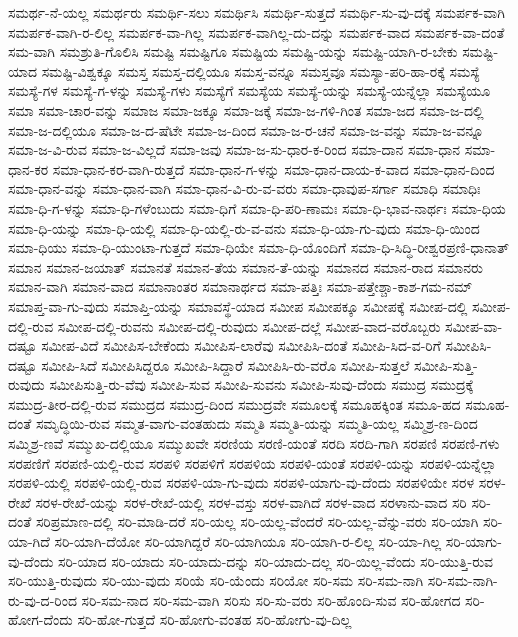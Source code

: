 {ಸಮರ್ಥ-ನೆ-ಯಲ್ಲ
ಸಮರ್ಥರು
ಸಮರ್ಥಿ-ಸಲು
ಸಮರ್ಥಿಸಿ
ಸಮರ್ಥಿ-ಸುತ್ತದೆ
ಸಮರ್ಥಿ-ಸು-ವು-ದಕ್ಕೆ
ಸಮರ್ಪಕ-ವಾಗಿ
ಸಮರ್ಪಕ-ವಾಗಿ-ರ-ಲಿಲ್ಲ
ಸಮರ್ಪಕ-ವಾ-ಗಿಲ್ಲ
ಸಮರ್ಪಕ-ವಾಗಿಲ್ಲ-ದು-ದನ್ನು
ಸಮರ್ಪಕ-ವಾದ
ಸಮರ್ಪಕ-ವಾ-ದಂತೆ
ಸಮ-ವಾಗಿ
ಸಮಶ್ರುತಿ-ಗೊಲಿಸಿ
ಸಮಷ್ಟಿ
ಸಮಷ್ಟಿಗೂ
ಸಮಷ್ಟಿಯ
ಸಮಷ್ಟಿ-ಯನ್ನು
ಸಮಷ್ಟಿ-ಯಾಗಿ-ರ-ಬೇಕು
ಸಮಷ್ಟಿ-ಯಾದ
ಸಮಷ್ಟಿ-ವಿಶ್ವಕ್ಕೂ
ಸಮಸ್ತ
ಸಮಸ್ತ-ದಲ್ಲಿಯೂ
ಸಮಸ್ತ-ವನ್ನೂ
ಸಮಸ್ತವೂ
ಸಮಸ್ಯಾ-ಪರಿ-ಹಾ-ರಕ್ಕೆ
ಸಮಸ್ಯೆ
ಸಮಸ್ಯೆ-ಗಳ
ಸಮಸ್ಯೆ-ಗ-ಳನ್ನು
ಸಮಸ್ಯೆ-ಗಳು
ಸಮಸ್ಯೆಗೆ
ಸಮಸ್ಯೆಯ
ಸಮಸ್ಯೆ-ಯನ್ನು
ಸಮಸ್ಯೆ-ಯನ್ನೆಲ್ಲಾ
ಸಮಸ್ಯೆಯೂ
ಸಮಾ
ಸಮಾ-ಚಾರ-ವನ್ನು
ಸಮಾಜ
ಸಮಾ-ಜಕ್ಕೂ
ಸಮಾ-ಜಕ್ಕೆ
ಸಮಾ-ಜ-ಗಳಿ-ಗಿಂತ
ಸಮಾ-ಜದ
ಸಮಾ-ಜ-ದಲ್ಲಿ
ಸಮಾ-ಜ-ದಲ್ಲಿಯೂ
ಸಮಾ-ಜ-ದ-ಷೆಟೇ
ಸಮಾ-ಜ-ದಿಂದ
ಸಮಾ-ಜ-ರ-ಚನೆ
ಸಮಾ-ಜ-ವನ್ನು
ಸಮಾ-ಜ-ವನ್ನೂ
ಸಮಾ-ಜ-ವಿ-ರುವ
ಸಮಾ-ಜ-ವಿಲ್ಲದೆ
ಸಮಾ-ಜವು
ಸಮಾ-ಜ-ಸು-ಧಾರ-ಕ-ರಿಂದ
ಸಮಾ-ದಾನ
ಸಮಾ-ಧಾನ
ಸಮಾ-ಧಾನ-ಕರ
ಸಮಾ-ಧಾನ-ಕರ-ವಾಗಿ-ರುತ್ತದೆ
ಸಮಾ-ಧಾನ-ಗ-ಳನ್ನು
ಸಮಾ-ಧಾನ-ದಾಯ-ಕ-ವಾದ
ಸಮಾ-ಧಾನ-ದಿಂದ
ಸಮಾ-ಧಾನ-ವನ್ನು
ಸಮಾ-ಧಾನ-ವಾಗಿ
ಸಮಾ-ಧಾನ-ವಿ-ರು-ವ-ವರು
ಸಮಾ-ಧಾವುಪ-ಸರ್ಗಾ
ಸಮಾಧಿ
ಸಮಾಧಿಃ
ಸಮಾ-ಧಿ-ಗ-ಳನ್ನು
ಸಮಾ-ಧಿ-ಗಳೆಂಬುದು
ಸಮಾ-ಧಿಗೆ
ಸಮಾ-ಧಿ-ಪರಿ-ಣಾಮಃ
ಸಮಾ-ಧಿ-ಭಾವ-ನಾರ್ಥಃ
ಸಮಾ-ಧಿಯ
ಸಮಾ-ಧಿ-ಯನ್ನು
ಸಮಾ-ಧಿ-ಯಲ್ಲಿ
ಸಮಾ-ಧಿ-ಯಲ್ಲಿ-ರು-ವ-ವನು
ಸಮಾ-ಧಿ-ಯಾ-ಗು-ವುದು
ಸಮಾ-ಧಿ-ಯಿಂದ
ಸಮಾ-ಧಿಯು
ಸಮಾ-ಧಿ-ಯುಂಟಾ-ಗುತ್ತದೆ
ಸಮಾ-ಧಿಯೇ
ಸಮಾ-ಧಿ-ಯೊಂದಿಗೆ
ಸಮಾ-ಧಿ-ಸಿದ್ಧಿ-ರೀಶ್ವರಪ್ರಣಿ-ಧಾನಾತ್
ಸಮಾನ
ಸಮಾನ-ಜಯಾತ್
ಸಮಾನತೆ
ಸಮಾನ-ತೆಯ
ಸಮಾನ-ತೆ-ಯನ್ನು
ಸಮಾನದ
ಸಮಾನ-ರಾದ
ಸಮಾನರು
ಸಮಾನ-ವಾಗಿ
ಸಮಾನ-ವಾದ
ಸಮಾನಾಂತರ
ಸಮಾನಾರ್ಥದ
ಸಮಾ-ಪತ್ತಿಃ
ಸಮಾ-ಪತ್ತೇಶ್ಚಾ-ಕಾಶ-ಗಮ-ನಮ್
ಸಮಾಪ್ತ-ವಾ-ಗು-ವುದು
ಸಮಾಪ್ತಿ-ಯನ್ನು
ಸಮಾವಸ್ಥೆ-ಯಾದ
ಸಮೀಪ
ಸಮೀಪಕ್ಕೂ
ಸಮೀಪಕ್ಕೆ
ಸಮೀಪ-ದಲ್ಲಿ
ಸಮೀಪ-ದಲ್ಲಿ-ರುವ
ಸಮೀಪ-ದಲ್ಲಿ-ರುವನು
ಸಮೀಪ-ದಲ್ಲಿ-ರುವುದು
ಸಮೀಪ-ದಲ್ಲೆ
ಸಮೀಪ-ವಾದ-ವರೊಬ್ಬರು
ಸಮೀಪ-ವಾ-ದಷ್ಟೂ
ಸಮೀಪ-ವಿದೆ
ಸಮೀಪಿಸ-ಬೇಕೆಂದು
ಸಮೀಪಿಸ-ಲಾರೆವು
ಸಮೀಪಿಸಿ-ದಂತೆ
ಸಮೀಪಿ-ಸಿದ-ವ-ರಿಗೆ
ಸಮೀಪಿಸಿ-ದಷ್ಟೂ
ಸಮೀಪಿ-ಸಿದೆ
ಸಮೀಪಿಸಿದ್ದರೂ
ಸಮೀಪಿ-ಸಿದ್ದಾರೆ
ಸಮೀಪಿಸಿ-ರು-ವರೊ
ಸಮೀಪಿ-ಸುತ್ತಲೆ
ಸಮೀಪಿ-ಸುತ್ತಿ-ರುವುದು
ಸಮೀಪಿಸುತ್ತಿ-ರು-ವೆವು
ಸಮೀಪಿ-ಸುವ
ಸಮೀಪಿ-ಸುವನು
ಸಮೀಪಿ-ಸುವು-ದೆಂದು
ಸಮುದ್ರ
ಸಮುದ್ರಕ್ಕೆ
ಸಮುದ್ರ-ತೀರ-ದಲ್ಲಿ-ರುವ
ಸಮುದ್ರದ
ಸಮುದ್ರ-ದಿಂದ
ಸಮುದ್ರವೇ
ಸಮೂಲಕ್ಕೆ
ಸಮೂಹಕ್ಕಿಂತ
ಸಮೂ-ಹದ
ಸಮೂಹ-ದಂತೆ
ಸಮೃದ್ಧಿಯಿ-ರುವ
ಸಮ್ಮತ-ವಾಗು-ವಂತಹುದು
ಸಮ್ಮತಿ
ಸಮ್ಮತಿ-ಯನ್ನು
ಸಮ್ಮತಿ-ಯಲ್ಲ
ಸಮ್ಮಿಶ್ರ-ಣ-ದಿಂದ
ಸಮ್ಮಿಶ್ರ-ಣವೆ
ಸಮ್ಮುಖ-ದಲ್ಲಿಯೂ
ಸಮ್ಮುಖವೇ
ಸರಣಿಯ
ಸರಣಿ-ಯಂತೆ
ಸರದಿ
ಸರದಿ-ಗಾಗಿ
ಸರಪಣಿ
ಸರಪಣಿ-ಗಳು
ಸರಪಣಿಗೆ
ಸರಪಣಿ-ಯಲ್ಲಿ-ರುವ
ಸರಪಳಿ
ಸರಪಳಿಗೆ
ಸರಪಳಿಯ
ಸರಪಳಿ-ಯಂತೆ
ಸರಪಳಿ-ಯನ್ನು
ಸರಪಳಿ-ಯನ್ನೆಲ್ಲಾ
ಸರಪಳಿ-ಯಲ್ಲಿ
ಸರಪಳಿ-ಯಲ್ಲಿ-ರುವ
ಸರಪಳಿ-ಯಾ-ಗು-ವುದು
ಸರಪಳಿ-ಯಾಗು-ವು-ದೆಂದು
ಸರಪಳಿಯೇ
ಸರಳ
ಸರಳ-ರೇಖೆ
ಸರಳ-ರೇಖೆ-ಯನ್ನು
ಸರಳ-ರೇಖೆ-ಯಲ್ಲಿ
ಸರಳ-ವಸ್ತು
ಸರಳ-ವಾಗಿದೆ
ಸರಳ-ವಾದ
ಸರಳಾನು-ವಾದ
ಸರಿ
ಸರಿ-ದಂತೆ
ಸರಿಪ್ರಮಾಣ-ದಲ್ಲಿ
ಸರಿ-ಮಾಡಿ-ದರೆ
ಸರಿ-ಯಲ್ಲ
ಸರಿ-ಯಲ್ಲ-ವೆಂದರೆ
ಸರಿ-ಯಲ್ಲ-ವೆನ್ನು-ವರು
ಸರಿ-ಯಾಗಿ
ಸರಿ-ಯಾ-ಗಿದೆ
ಸರಿ-ಯಾಗಿ-ದೆಯೋ
ಸರಿ-ಯಾಗಿದ್ದರೆ
ಸರಿ-ಯಾಗಿಯೂ
ಸರಿ-ಯಾಗಿ-ರ-ಲಿಲ್ಲ
ಸರಿ-ಯಾ-ಗಿಲ್ಲ
ಸರಿ-ಯಾಗು-ವು-ದೆಂದು
ಸರಿ-ಯಾದ
ಸರಿ-ಯಾದು
ಸರಿ-ಯಾದು-ದನ್ನು
ಸರಿ-ಯಾದು-ದಲ್ಲ
ಸರಿ-ಯಿಲ್ಲ-ವೆಂದು
ಸರಿ-ಯುತ್ತಿ-ರುವ
ಸರಿ-ಯುತ್ತಿ-ರುವುದು
ಸರಿ-ಯು-ವುದು
ಸರಿಯೆ
ಸರಿ-ಯೆಂದು
ಸರಿಯೋ
ಸರಿ-ಸಮ
ಸರಿ-ಸಮ-ನಾಗಿ
ಸರಿ-ಸಮ-ನಾಗಿ-ರು-ವು-ದ-ರಿಂದ
ಸರಿ-ಸಮ-ನಾದ
ಸರಿ-ಸಮ-ವಾಗಿ
ಸರಿಸು
ಸರಿ-ಸು-ವರು
ಸರಿ-ಹೊಂದಿ-ಸುವ
ಸರಿ-ಹೋಗದ
ಸರಿ-ಹೋಗ-ದೆಂದು
ಸರಿ-ಹೋ-ಗುತ್ತದೆ
ಸರಿ-ಹೋಗು-ವಂತಹ
ಸರಿ-ಹೋಗು-ವು-ದಿಲ್ಲ
}
